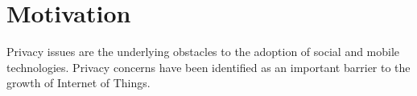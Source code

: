 \chapter{Motivation}\label{motivation}
Privacy issues are the underlying obstacles to the adoption of social and mobile technologies. Privacy concerns have been identified as an important barrier to the growth of Internet of Things.
